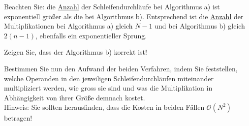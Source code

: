 Beachten Sie: die \underline{Anzahl} der Schleifendurchläufe bei Algorithmus a)
ist exponentiell größer als die bei Algorithmus b).  Entsprechend ist die
\underline{Anzahl} der Multiplikationen bei Algorithmus a) gleich $N-1$ und bei
Algorithmus b) gleich $2(n-1)$, ebenfalls ein exponentieller Sprung.

\begin{flushenum}
\item Zeigen Sie, dass der Algorithmus b) korrekt ist!
\item Bestimmen Sie nun den Aufwand der beiden Verfahren, indem Sie
	feststellen, welche Operanden in den jeweiligen Schleifendurchläufen
	miteinander multipliziert werden, wie gross sie sind und was die
	Multiplikation in Abhängigkeit von ihrer Größe demnach kostet.\\
	Hinweis: Sie sollten herausfinden, dass die Kosten in beiden Fällen
	$\mathcal{O}(N^2)$ betragen!
\end{flushenum}

